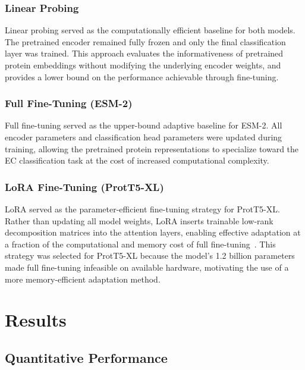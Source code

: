 \documentclass{article}
\begin{document}
\subsubsection{Linear Probing}

Linear probing served as the computationally efficient baseline for both models. The pretrained encoder remained fully frozen and only the final classification layer was trained. This approach evaluates the informativeness of pretrained protein embeddings without modifying the underlying encoder weights, and provides a lower bound on the performance achievable through fine-tuning.

\subsubsection{Full Fine-Tuning (ESM-2)}

Full fine-tuning served as the upper-bound adaptive baseline for ESM-2. All encoder parameters and classification head parameters were updated during training, allowing the pretrained protein representations to specialize toward the EC classification task at the cost of increased computational complexity.

\subsubsection{LoRA Fine-Tuning (ProtT5-XL)}

LoRA served as the parameter-efficient fine-tuning strategy for ProtT5-XL. Rather than updating all model weights, LoRA inserts trainable low-rank decomposition matrices into the attention layers, enabling effective adaptation at a fraction of the computational and memory cost of full fine-tuning~\cite{hu2021lora}. This strategy was selected for ProtT5-XL because the model's 1.2 billion parameters made full fine-tuning infeasible on available hardware, motivating the use of a more memory-efficient adaptation method.

\section{Results}

\subsection{Quantitative Performance}
\end{document}
